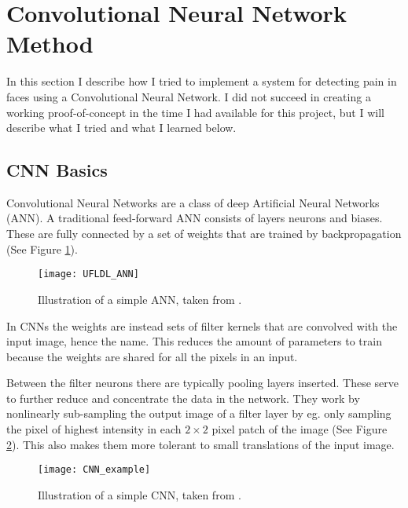 \documentclass[Main]{subfiles}
\begin{document}
\section{Convolutional Neural Network Method} %
	\label{sec:convolutional_neural_network_method}
	In this section I describe how I tried to implement a system for detecting pain in faces using a Convolutional Neural Network.
	I did not succeed in creating a working proof-of-concept in the time I had available for this project, but I will describe what I tried and what I learned below.

	\subsection{CNN Basics} %
		\label{sub:cnn_basics}
		Convolutional Neural Networks are a class of deep Artificial Neural Networks (ANN).
		A traditional feed-forward ANN consists of layers neurons and biases.
		These are fully connected by a set of weights that are trained by backpropagation (See Figure \ref{fig:ufldl_ann}).
		\begin{figure}[H]
			\begin{center}
				\texttt{[image: UFLDL\_ANN]}
			\end{center}
			\caption{Illustration of a simple ANN, taken from \cite{ufldl}.}
			\label{fig:ufldl_ann}
		\end{figure}

		In CNNs the weights are instead sets of filter kernels that are convolved with the input image, hence the name.
		This reduces the amount of parameters to train because the weights are shared for all the pixels in an input.

		Between the filter neurons there are typically pooling layers inserted.
		These serve to further reduce and concentrate the data in the network.
		They work by nonlinearly sub-sampling the output image of a filter layer by eg. only sampling the pixel of highest intensity in each $2\times2$ pixel patch of the image (See Figure \ref{fig:lisa_cnn}).
		This also makes them more tolerant to small translations of the input image.
		\begin{figure}[H]
			\begin{center}
				\texttt{[image: CNN\_example]}
			\end{center}
			\caption{Illustration of a simple CNN, taken from \cite{LISAlab2015}.}
			\label{fig:lisa_cnn}
		\end{figure}
		
\end{document}
